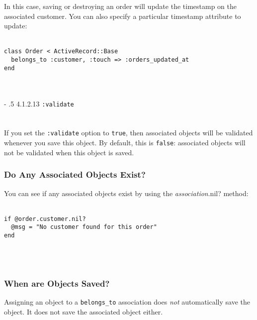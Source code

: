 \documentclass[10pt]{book}
\makeatletter
\renewcommand\paragraph{%
   \@startsection{paragraph}{4}{0mm}%
      {-\baselineskip}%
      {.5\baselineskip}%
      {\normalfont\scriptsize\bfseries}}
\makeatother
\begin{document}
In this case, saving or destroying an order will update the timestamp  on the associated customer. You can also specify a particular timestamp  attribute to update:
\\ \\
\begin{minipage}{\textwidth}{\scriptsize
\begin{verbatim}
class Order < ActiveRecord::Base
  belongs_to :customer, :touch => :orders_updated_at
end
\end{verbatim}}
\end{minipage}
\\ \\

\paragraph{4.1.2.13 \texttt{:validate}}\\ \\\\

If you set the \texttt{:validate} option to \texttt{true}, then associated objects will be validated whenever you save this object. By default, this is \texttt{false}: associated objects will not be validated when this object is saved.

\subsubsection{ Do Any Associated Objects Exist?}

You can see if any associated objects exist by using the \emph{association}.nil? method:
\\ \\
\begin{minipage}{\textwidth}{\scriptsize
\begin{verbatim}
if @order.customer.nil?
  @msg = "No customer found for this order"
end
\end{verbatim}}
\end{minipage}
\\ \\

\subsubsection{ When are Objects Saved?}

Assigning an object to a \texttt{belongs\_to} association does \emph{not} automatically save the object. It does not save the associated object either.
\end{document}
